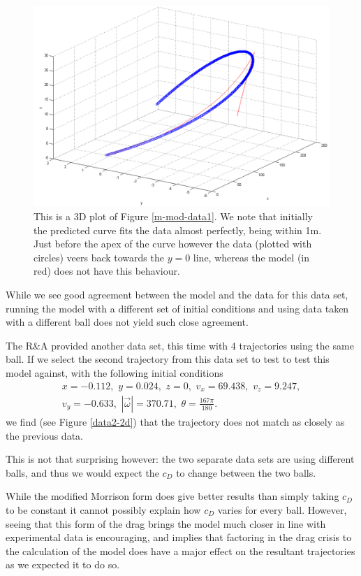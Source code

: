\begin{figure}[h]
\centering
\includegraphics[scale=0.5]{../images/m-mod-data1-3d.png}
\caption[Model with using the modified Morrison form for $c_D$ in 3D.]{This is a 3D plot of Figure \ref{m-mod-data1}.
We note that initially the predicted curve fits the data almost perfectly, being within 1m. Just before
the apex of the curve however the data (plotted with circles) veers back towards the $y=0$ line, whereas
the model (in red) does not have this behaviour.}
\end{figure}

While we see good agreement between the model and the data for this data set, running the model with
a different set of initial conditions and using data taken with a different ball does not yield such
close agreement.

The R\&A provided another data set, this time with 4 trajectories using the same ball. If we select
the second trajectory from this data set to test to test this model against, with the following 
initial conditions
\begin{gather*}
x = -0.112, \,\, y = 0.024, \,\, z = 0, \,\, v_x = 69.438, \,\, v_z = 9.247, \\ v_y = -0.633, \,\,
|\vec{\omega}| = 370.71,\,\, \theta = \frac{167\pi}{180} .
\end{gather*}
we find (see Figure \ref{data2-2d}) that the trajectory does not match as closely as the previous data.

This is not that surprising however: the two separate data sets are using different balls, and thus
we would expect the $c_D$ to change between the two balls.

While the modified Morrison form does give better results than simply taking $c_D$ to be constant
it cannot possibly explain how $c_D$ varies for every ball. However, seeing that this form of the drag
brings the model much closer in line with experimental data is encouraging, and implies that factoring
in the drag crisis to the calculation of the model does have a major effect on the resultant trajectories
as we expected it to do so.

